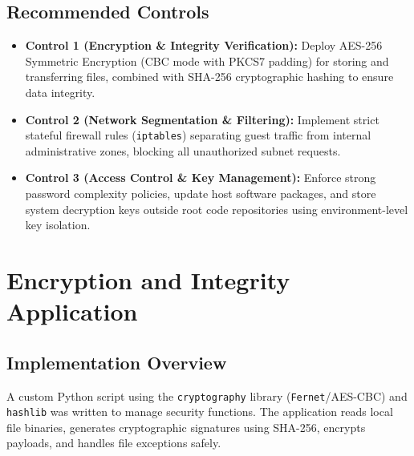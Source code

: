 \documentclass[12pt,a4paper]{article}
\begin{document}
\subsection{Recommended Controls}
\begin{itemize}
    \item \textbf{Control 1 (Encryption \& Integrity Verification):} Deploy AES-256 Symmetric Encryption (CBC mode with PKCS7 padding) for storing and transferring files, combined with SHA-256 cryptographic hashing to ensure data integrity.
    \item \textbf{Control 2 (Network Segmentation \& Filtering):} Implement strict stateful firewall rules (\texttt{iptables}) separating guest traffic from internal administrative zones, blocking all unauthorized subnet requests.
    \item \textbf{Control 3 (Access Control \& Key Management):} Enforce strong password complexity policies, update host software packages, and store system decryption keys outside root code repositories using environment-level key isolation.
\end{itemize}

\section{Encryption and Integrity Application}

\subsection{Implementation Overview}
A custom Python script using the \texttt{cryptography} library (\texttt{Fernet}/AES-CBC) and \texttt{hashlib} was written to manage security functions. The application reads local file binaries, generates cryptographic signatures using SHA-256, encrypts payloads, and handles file exceptions safely.
\end{document}
